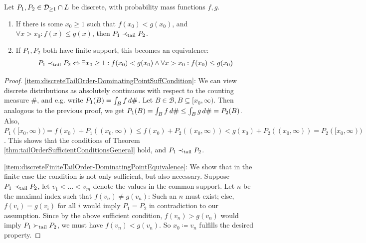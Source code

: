\documentclass[a4paper]{scrreprt}
\newcommand{\B}{\mathcal{B}}
\begin{document}
    \begin{thm}
        Let $P_1, P_2 \in \mathcal{D}_{\geq1} \cap L$ be discrete, with probability mass functions $f, g$.
        \begin{enumerate}
            \item 
            If there is some $x_0 \geq 1$ such that $f(x_0) < g(x_0)$, and $\forall x > x_0: f(x) \leq g(x)$, then $P_1 \prec_{\text{tail}} P_2$.
            \label{item:discreteTailOrder-DominatingPointSuffCondition}
            
            \item 
            If $P_1, P_2$ both have finite support, this becomes an equivalence:
            \begin{gather}
                P_1 \prec_{\text{tail}} P_2 \Leftrightarrow \exists x_0 \geq 1: f(x_0) < g(x_0) \wedge \forall x > x_0: f(x_0) \leq g(x_0)
                \label{eq:discreteFiniteTailOrder-DominatingPointEquivalence}
            \end{gather}            
            \label{item:discreteFiniteTailOrder-DominatingPointEquivalence}
        \end{enumerate}        
    \label{thm:discreteTailOrderSuffConditions}
    \end{thm}
    \vspace{-1.2cm}
    \begin{proof}
        \ref{item:discreteTailOrder-DominatingPointSuffCondition}:
        We can view discrete distributions as absolutely continuous with respect to the counting measure $\#$, and e.g. write $P_1(B) = \int_{B} f \, d\#$.
        Let $B \in \B, B \subseteq [x_0, \infty)$. Then analogous to the previous proof, we get
        $P_1(B) = \int_{B} f \, d\# \leq \int_{B} g \, d\# = P_2(B)$.
        Also, $P_1([x_0, \infty)) = f(x_0) + P_1((x_0, \infty)) \leq f(x_0) + P_2((x_0, \infty)) < g(x_0) + P_2((x_0, \infty)) = P_2([x_0, \infty))$.
        This shows that the conditions of Theorem \ref{thm:tailOrderSufficientConditionsGeneral} hold, and $P_1 \prec_{\text{tail}} P_2$.
        
        \ref{item:discreteFiniteTailOrder-DominatingPointEquivalence}:
        We show that in the finite case the condition is not only sufficient, but also necessary.
        Suppose $P_1 \prec_{\text{tail}} P_2$, let $v_1 < \dots < v_m$ denote the values in the common support.
        Let $n$ be the maximal index such that $f(v_n) \neq g(v_n)$: Such an $n$ must exist; else, $f(v_i) = g(v_i)$ for all $i$ would imply $P_1 = P_2$ in contradiction to our assumption.
        Since by the above sufficient condition, $f(v_n) > g(v_n)$ would imply $P_1 \succ_{\text{tail}} P_2$, we must have $f(v_n) < g(v_n)$. So $x_0 \coloneqq v_n$ fulfills the desired property.
    \end{proof}
\end{document}
